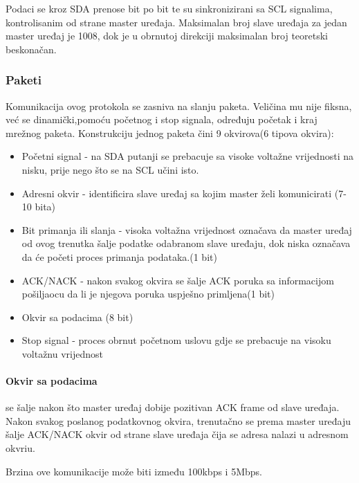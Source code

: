 \documentclass[../Document.tex]{subfiles}
\begin{document}
\noindent Podaci se kroz SDA prenose bit po bit te su sinkronizirani sa SCL signalima, kontrolisanim od strane master uređaja. Maksimalan broj slave uređaja za jedan master uređaj je 1008, dok je u obrnutoj direkciji maksimalan broj teoretski beskonačan.

\subsubsection{Paketi}
Komunikacija ovog protokola se zasniva na slanju paketa. Veličina mu nije fiksna, već se dinamički,pomoću početnog i stop signala, određuju početak i kraj mrežnog paketa. Konstrukciju jednog paketa čini 9 okvirova(6 tipova okvira):

\begin{itemize}
    \item Početni signal - na SDA putanji se prebacuje sa visoke voltažne vrijednosti na nisku, prije nego što se na SCL učini isto.
    \item Adresni okvir - identificira slave uređaj sa kojim master želi komunicirati (7-10 bita)
    \item Bit primanja ili slanja - visoka voltažna vrijednost označava da master uređaj od ovog trenutka šalje podatke odabranom slave uređaju, dok niska označava da će početi proces primanja podataka.(1 bit)
    \item ACK/NACK - nakon svakog okvira se šalje ACK poruka sa informacijom pošiljaocu da li je njegova poruka uspješno primljena(1 bit)
    \item Okvir sa podacima (8 bit)
    \item Stop signal - proces obrnut početnom uslovu gdje se prebacuje na visoku voltažnu vrijednost
\end{itemize}


\paragraph{Okvir sa podacima} se šalje nakon što master uređaj dobije pozitivan ACK frame od slave uređaja. Nakon svakog poslanog podatkovnog okvira, trenutačno se prema master uređaju šalje ACK/NACK okvir od strane slave uređaja čija se adresa nalazi u adresnom okvriu.\\


\noindent Brzina ove komunikacije može biti između 100kbps i 5Mbps.\\
\end{document}
